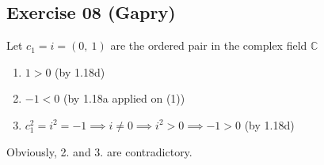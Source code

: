 \subsection*{Exercise 08 (Gapry)}
Let $c_1 = i = (0,\ 1)$ are the ordered pair in the complex field $\mathbb{C}$

\begin{enumerate}
    \item{$1 > 0$ (by 1.18d) }
    \item{$-1 < 0$  (by 1.18a applied on (1))}
    \item{$c_1^2 = i^2 = -1 \implies i \neq 0 \implies i^2 > 0 \implies -1 > 0$ (by 1.18d)}
\end{enumerate}

Obviously, 2. and 3. are contradictory.
 
